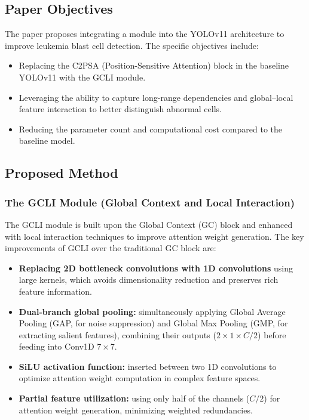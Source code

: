 \subsection{Paper Objectives}
The paper proposes integrating a  module into the YOLOv11 architecture to improve leukemia blast cell detection. The specific objectives include:
\begin{itemize}
    \item Replacing the C2PSA (Position-Sensitive Attention) block in the baseline YOLOv11 with the GCLI module.
    \item Leveraging the ability to capture long-range dependencies and global--local feature interaction to better distinguish abnormal cells.
    \item Reducing the parameter count and computational cost compared to the baseline model.
\end{itemize}

\subsection{Proposed Method}

\subsubsection{The GCLI Module (Global Context and Local Interaction)}
The GCLI module is built upon the Global Context (GC) block and enhanced with local interaction techniques to improve attention weight generation. The key improvements of GCLI over the traditional GC block are:
\begin{itemize}
    \item \textbf{Replacing 2D bottleneck convolutions with 1D convolutions} using large kernels, which avoids dimensionality reduction and preserves rich feature information.
    \item \textbf{Dual-branch global pooling:} simultaneously applying Global Average Pooling (GAP, for noise suppression) and Global Max Pooling (GMP, for extracting salient features), combining their outputs ($2 \times 1 \times C/2$) before feeding into Conv1D $7\times7$.
    \item \textbf{SiLU activation function:} inserted between two 1D convolutions to optimize attention weight computation in complex feature spaces.
    \item \textbf{Partial feature utilization:} using only half of the channels ($C/2$) for attention weight generation, minimizing weighted redundancies.
\end{itemize}

